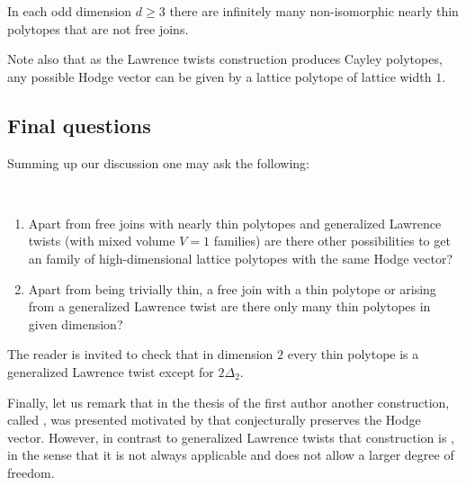 \documentclass[reqno, 11pt, a4paper, oneside]{amsart}
\begin{document}
\begin{cor}
    In each odd dimension $d\geq 3$ there are infinitely many non-isomorphic nearly thin polytopes that are not free joins.
\end{cor}


    Note also that as the Lawrence twists  construction produces Cayley polytopes, any possible Hodge vector can be given by a lattice polytope of lattice width $1$. 

\subsection{Final questions}

Summing up our discussion one may ask the following:

\begin{question}\
    \begin{enumerate}
        \item Apart from free joins with nearly thin polytopes and generalized Lawrence twists (with mixed volume $V=1$ families) are there other possibilities to get an  family of high-dimensional lattice polytopes with the same Hodge vector?
        \item Apart from being trivially thin, a free join with a thin polytope or arising from a generalized Lawrence twist are there only \emp{finitely} many thin polytopes in given dimension?
    \end{enumerate}
\end{question}

The reader is invited to check that in dimension $2$ every thin polytope is a generalized Lawrence twist except for $2 \Delta_2$. 

Finally, let us remark that in the thesis \cite{vadym_thesis} of the first author another construction, called , was presented motivated by \cite{GGFernando} that conjecturally preserves the Hodge vector. However, in contrast to generalized Lawrence twists that construction is , in the sense that it is not always applicable and does not allow a larger degree of freedom.



\end{document}
